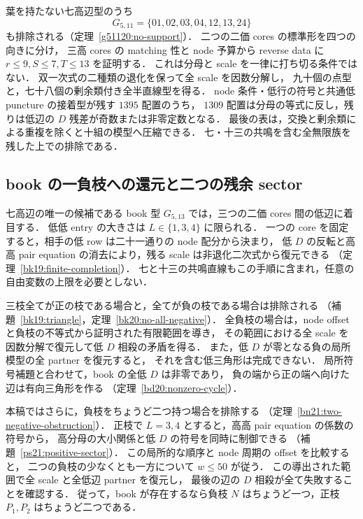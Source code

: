 葉を持たない七高辺型のうち
\[
 G_{5,11}=\{01,02,03,04,12,13,24\}
\]
も排除される（定理~\ref{g51120:no-support}）．
二つの二価 cores の標準形を四つの向きに分け，
三高 cores の matching 性と node 予算から reverse data に
$r\le9,S\le7,T\le13$ を証明する．
これは分母と scale を一律に打ち切る条件ではない．
双一次式の二種類の退化を保って全 scale を因数分解し，
九十個の点型と，七十八個の剰余類付き全半直線型を得る．
node 条件・低行の符号と共通低 puncture の接着型が残す $1395$ 配置のうち，
$1309$ 配置は分母の等式に反し，残りは低辺の $D$ 残差が奇数または非零定数となる．
最後の表は，交換と剰余類による重複を除くと十組の模型へ圧縮できる．
七・十三の共鳴を含む全無限族を残した上での排除である．

\subsection{book の一負枝への還元と二つの残余 sector}

七高辺の唯一の候補である book 型 $G_{5,13}$ では，三つの二価 cores 間の低辺に着目する．
低低 entry の大きさは $L\in\{1,3,4\}$ に限られる．
一つの core を固定すると，相手の低 row は二十一通りの node 配分から決まり，
低 $D$ の反転と高高 pair equation の消去により，残る scale は非退化二次式から復元できる
（定理~\ref{bk19:finite-completion}）．
七と十三の共鳴直線もこの手順に含まれ，任意の自由変数の上限を必要としない．

三枝全てが正の枝である場合と，全てが負の枝である場合は排除される
（補題~\ref{bk19:triangle}，定理~\ref{bk20:no-all-negative}）．
全負枝の場合は，node offset と負枝の不等式から証明された有限範囲を導き，
その範囲における全 scale を因数分解で復元して低 $D$ 相殺の矛盾を得る．
また，低 $D$ が零となる負の局所模型の全 partner を復元すると，
それを含む低三角形は完成できない．
局所符号補題と合わせて，book の全低 $D$ は非零であり，
負の端から正の端へ向けた辺は有向三角形を作る
（定理~\ref{bd20:nonzero-cycle}）．

本稿ではさらに，負枝をちょうど二つ持つ場合を排除する
（定理~\ref{bn21:two-negative-obstruction}）．
正枝で $L=3,4$ とすると，高高 pair equation の係数の符号から，
高分母の大小関係と低 $D$ の符号を同時に制御できる
（補題~\ref{ps21:positive-sector}）．
この局所的な順序と node 周期の offset を比較すると，
二つの負枝の少なくとも一方について $w\le50$ が従う．
この導出された範囲で全 scale と全低辺 partner を復元し，
最後の辺の $D$ 相殺が全て失敗することを確認する．
従って，book が存在するなら負枝 $N$ はちょうど一つ，正枝 $P_1,P_2$ はちょうど二つである．

